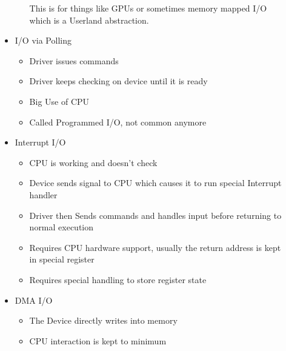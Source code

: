 \documentclass{report}
\begin{document}
\begin{description}
\begin{itemize}
\begin{itemize}
\begin{mdframed}
                            This is for things like GPUs or sometimes memory
                            mapped I/O which is a Userland abstraction.
                        \end{mdframed}
                \end{itemize}
            \item I/O via Polling 
                \begin{itemize}
                    \item Driver issues commands
                    \item Driver keeps checking on device until it is ready
                    \item Big Use of CPU
                    \item Called Programmed I/O, not common anymore
                \end{itemize}
            \item Interrupt I/O
                \begin{itemize}
                    \item CPU is working and doesn't check
                    \item Device sends signal to CPU which causes
                        it to run special Interrupt handler
                    \item Driver then Sends commands and handles input
                        before returning to normal execution
                    \item Requires CPU hardware support, usually
                        the return address is kept in special register
                    \item Requires special handling to store register state
                \end{itemize}
            \item DMA I/O
                \begin{itemize}
                    \item The Device directly writes into memory
                    \item CPU interaction is kept to minimum
                \end{itemize}
        \end{itemize}
\end{description}
\end{document}
